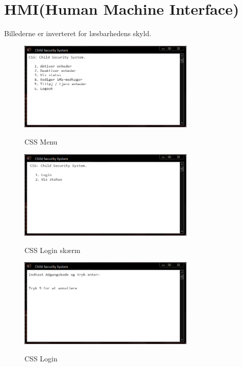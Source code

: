 \newpage
\section{HMI(Human Machine Interface)}

Billederne er inverteret for læsbarhedens skyld.

\begin{figure}[h] \centering
{\includegraphics[width=0.75\textwidth]{billeder/cmdprompt/CSS_menu}}
\caption{CSS Menu}
\end{figure}

\begin{figure}[h] \centering
{\includegraphics[width=0.75\textwidth]{billeder/cmdprompt/CSS_pre_login_menu}}
\caption{CSS Login skærm}
\end{figure}

\begin{figure}[h] \centering
{\includegraphics[width=0.75\textwidth]{billeder/cmdprompt/CSS_login}}
\caption{CSS Login}
\end{figure}

